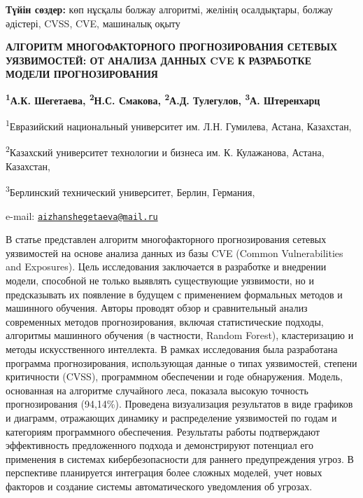 {\bfseries Түйін сөздер:} көп нұсқалы болжау алгоритмі, желінің
осалдықтары, болжау әдістері, CVSS, CVE, машиналық оқыту

\begin{articleheader}
{\bfseries АЛГОРИТМ МНОГОФАКТОРНОГО ПРОГНОЗИРОВАНИЯ СЕТЕВЫХ УЯЗВИМОСТЕЙ: ОТ
АНАЛИЗА ДАННЫХ CVE К РАЗРАБОТКЕ МОДЕЛИ ПРОГНОЗИРОВАНИЯ}

{\bfseries
\textsuperscript{1}А.К. Шегетаева\textsuperscript{\envelope },
\textsuperscript{2}Н.С. Смакова,
\textsuperscript{2}А.Д. Тулегулов,
\textsuperscript{3}А. Штеренхарц
}
\end{articleheader}

\begin{affiliation}
\textsuperscript{1}Евразийский национальный университет им. Л.Н. Гумилева, Астана, Казахстан,

\textsuperscript{2}Казахский университет технологии и бизнеса им. К. Кулажанова, Астана, Казахстан,

\textsuperscript{3}Берлинский технический университет, Берлин, Германия,

e-mail: \href{mailto:aizhanshegetaeva@mail.ru}{\nolinkurl{aizhanshegetaeva@mail.ru}}
\end{affiliation}

В статье представлен алгоритм многофакторного прогнозирования сетевых
уязвимостей на основе анализа данных из базы CVE (Common Vulnerabilities
and Exposures). Цель исследования заключается в разработке и внедрении
модели, способной не только выявлять существующие уязвимости, но и
предсказывать их появление в будущем с применением формальных методов и
машинного обучения. Авторы проводят обзор и сравнительный анализ
современных методов прогнозирования, включая статистические подходы,
алгоритмы машинного обучения (в частности, Random Forest), кластеризацию
и методы искусственного интеллекта. В рамках исследования была
разработана программа прогнозирования, использующая данные о типах
уязвимостей, степени критичности (CVSS), программном обеспечении и годе
обнаружения. Модель, основанная на алгоритме случайного леса, показала
высокую точность прогнозирования (94,14\%). Проведена визуализация
результатов в виде графиков и диаграмм, отражающих динамику и
распределение уязвимостей по годам и категориям программного
обеспечения. Результаты работы подтверждают эффективность предложенного
подхода и демонстрируют потенциал его применения в системах
кибербезопасности для раннего предупреждения угроз. В перспективе
планируется интеграция более сложных моделей, учет новых факторов и
создание системы автоматического уведомления об угрозах.

